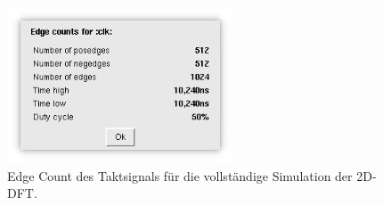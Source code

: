  \begin{figure}[htbp]
  \centering
  \includegraphics[width=0.6\textwidth]{img/Simulation_edge_count_clk.png}
  \caption{Edge Count des Taktsignals für die vollständige Simulation der 2D-DFT.}
 \end{figure}




 